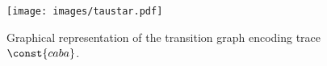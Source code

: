 \begin{figure}[!t]
	\centering
	\texttt{[image: images/taustar.pdf]}
	\caption{Graphical representation of the transition graph encoding trace $\const{caba}$.}\label{fig:taustar}
	
\end{figure}
%


